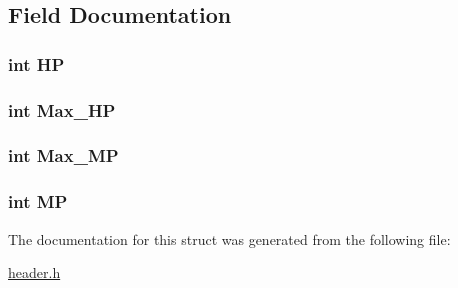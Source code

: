 \subsection{Field Documentation}
\hypertarget{structt__status_a58ca25ca6c9448a364b84539e42f1fa6}{
\subsubsection[{H\-P}]{\setlength{\rightskip}{0pt plus 5cm}int H\-P}}\label{structt__status_a58ca25ca6c9448a364b84539e42f1fa6}
\hypertarget{structt__status_a3ae8966f5c827b3c74072acda8de72af}{
\subsubsection[{Max\-\_\-\-H\-P}]{\setlength{\rightskip}{0pt plus 5cm}int Max\-\_\-\-H\-P}}\label{structt__status_a3ae8966f5c827b3c74072acda8de72af}
\hypertarget{structt__status_a5e48a681ff3d92aaa0e643fbc32ab2f7}{
\subsubsection[{Max\-\_\-\-M\-P}]{\setlength{\rightskip}{0pt plus 5cm}int Max\-\_\-\-M\-P}}\label{structt__status_a5e48a681ff3d92aaa0e643fbc32ab2f7}
\hypertarget{structt__status_a30fc75b90111fc791752dd1add6ed991}{
\subsubsection[{M\-P}]{\setlength{\rightskip}{0pt plus 5cm}int M\-P}}\label{structt__status_a30fc75b90111fc791752dd1add6ed991}


The documentation for this struct was generated from the following file\-:\begin{DoxyCompactItemize}
\item 
\hyperlink{header_8h}{header.\-h}\end{DoxyCompactItemize}
